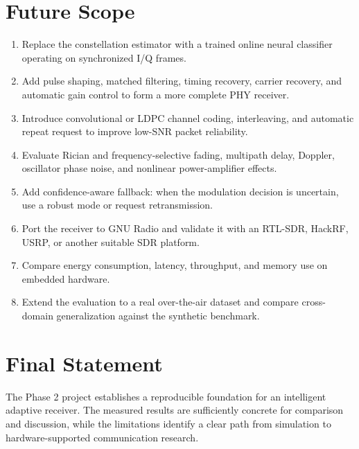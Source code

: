 \section{Future Scope}
\begin{enumerate}
\item Replace the constellation estimator with a trained online neural
      classifier operating on synchronized I/Q frames.
\item Add pulse shaping, matched filtering, timing recovery, carrier recovery,
      and automatic gain control to form a more complete PHY receiver.
\item Introduce convolutional or LDPC channel coding, interleaving, and
      automatic repeat request to improve low-SNR packet reliability.
\item Evaluate Rician and frequency-selective fading, multipath delay,
      Doppler, oscillator phase noise, and nonlinear power-amplifier effects.
\item Add confidence-aware fallback: when the modulation decision is
      uncertain, use a robust mode or request retransmission.
\item Port the receiver to GNU Radio and validate it with an RTL-SDR,
      HackRF, USRP, or another suitable SDR platform.
\item Compare energy consumption, latency, throughput, and memory use on
      embedded hardware.
\item Extend the evaluation to a real over-the-air dataset and compare
      cross-domain generalization against the synthetic benchmark.
\end{enumerate}

\section{Final Statement}
The Phase 2 project establishes a reproducible foundation for an intelligent
adaptive receiver. The measured results are sufficiently concrete for
comparison and discussion, while the limitations identify a clear path from
simulation to hardware-supported communication research.
